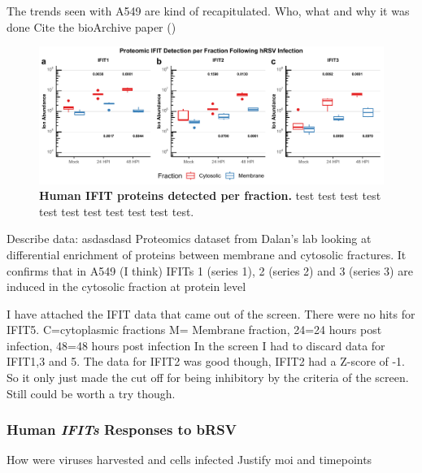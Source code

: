 The trends seen with A549 are kind of recapitulated.
 \label{Validation by Comparing to the Proteomic Dataset}
Who, what and why it was done  \newline
Cite the bioArchive paper (\cite{Jobe2023ViralCondensates})

\begin{figure}
    \centering
    \includegraphics[width=1\linewidth]{06. Chapter 1/Figs/01. Induction/13. merged_proteomics.pdf}
    \caption[Human IFIT proteins detected per fraction.]{\textbf{Human IFIT proteins detected per fraction.} test test test test test test test test test test test.}
    \label{Human IFIT proteins detected per fraction.}
\end{figure}

Describe data: \newline
asdasdasd \newline
Proteomics dataset from Dalan’s lab looking at differential enrichment of proteins between membrane and cytosolic fractures. It confirms that in A549 (I think) IFITs 1 (series 1), 2 (series 2) and 3 (series 3) are induced in the cytosolic fraction at protein level 



I have attached the IFIT data that came out of the screen. There were no hits for IFIT5. C=cytoplasmic fractions M= Membrane fraction, 24=24 hours post infection, 48=48 hours post infection
In the screen I had to discard data for IFIT1,3 and 5. The data for IFIT2 was good though, IFIT2 had a Z-score of -1. So it only just made the cut off for being inhibitory by the criteria of the screen. Still could be worth a try though.


\subsubsection{Human \textit{IFITs} Responses to bRSV} \label{Human IFITs Responses to bRSV}
How were viruses harvested and cells infected \newline
Justify moi and timepoints

